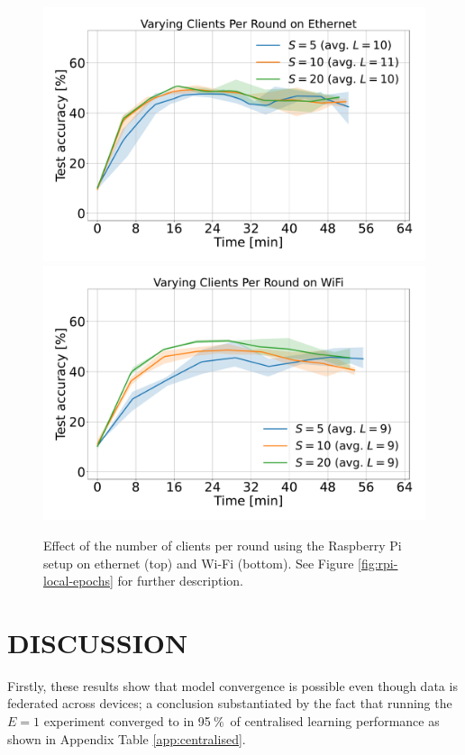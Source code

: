 \documentclass{article}
\newcommand{\unit}[1]{\ensuremath{\:\text{#1}}}
\newcommand{\pro}{\ensuremath{\unit{\%{}}}}
\begin{document}
    \begin{figure}[htb!]
    \centering
    \includegraphics[width=\linewidth]{imgs/time_avg_clients_per_round_Ethernet.pdf}
    \includegraphics[width=\linewidth]{imgs/time_avg_clients_per_round_WiFi.pdf}
    \caption{Effect of the number of clients per round using the Raspberry Pi setup on ethernet (top) and Wi-Fi (bottom).
    See Figure \ref{fig:rpi-local-epochs} for further description.}
    \label{fig:rpi-clients-per-round}
\end{figure}\noindent

\section{DISCUSSION}%
\label{sec:discussion}
Firstly, these results show that model convergence is possible even though data is federated across devices; a conclusion substantiated by the fact that running the $E=1$ experiment converged to in 95\pro\ of centralised learning performance as shown in Appendix Table \ref{app:centralised}.
\end{document}
